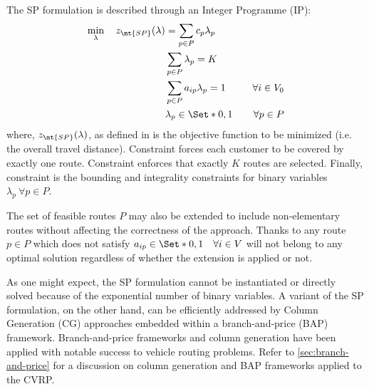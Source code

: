 The SP formulation is described through an Integer Programme (IP):
\begin{align}
	\min_{\lambda} \quad z_\mt{SP}(\lambda) & = \sum_{p \in P}  c_p \lambda_p              & \label{eq:set-partitioning-obj-func}                                                       \\
	                                        & \sum_{p \in P} \lambda_{p} = K               & \label{eq:set-partitioning-K-routes}                                                       \\
	                                        & \sum_{p \in P}  a_{ip} \lambda_p = 1         & \quad \forall i \in V_0 \label{eq:set-partitioning-customers-visited-by-exactly-one-route} \\
	                                        & \lambda_p                    \in \Set*{0, 1} & \quad \forall p \in P \label{eq:set-partitioning-lambda-mip-var-bounds}
\end{align}
where, $z_\mt{SP}(\lambda)$, as defined in  is the objective function to be minimized (i.e. the overall travel distance).
Constraint  forces each customer to be covered by exactly one route.
Constraint  enforces that exactly $K$ routes are selected.
Finally, constraint  is the bounding and integrality constraints for binary variables $\lambda_p \ \forall p \in P$.

The set of feasible routes $P$ may also be extended to include non-elementary routes
without affecting the correctness of the approach.
Thanks to 
any route $p \in P$ which does not satisfy $a_{ip} \in \Set*{0, 1} \quad \forall i \in V$
will not belong to any optimal solution
regardless of whether the extension is applied or not.

As one might expect, the SP formulation
cannot be instantiated or directly solved
because of the exponential number of binary variables.
A variant of the SP formulation, on the other hand,
can be efficiently addressed by Column Generation (CG) approaches
embedded within a branch-and-price (BAP) framework.
Branch-and-price frameworks and column generation have been applied
with notable success to vehicle routing problems.
Refer to \cref{sec:branch-and-price} for a discussion on
column generation and BAP frameworks applied to the CVRP.

